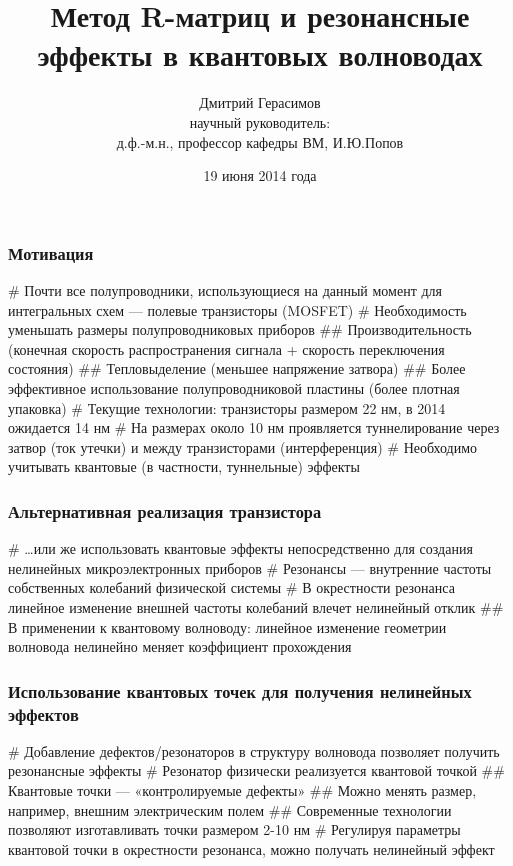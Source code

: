 \documentclass{beamer}
\title[]{Метод R-матриц и резонансные эффекты в квантовых волноводах}
\author[Дмитрий Герасимов]{Дмитрий Герасимов\\{\small научный руководитель: \\ д.ф.-м.н., профессор кафедры ВМ, И.Ю.Попов}}
\institute[ИТМО]{Университет ИТМО}
\date{19 июня 2014 года}
\begin{document}
\maketitle

\begin{frame}[fragile]
\frametitle{Мотивация}
\begin{easylist}[itemize]
# Почти все полупроводники, использующиеся на данный момент для интегральных схем — полевые транзисторы (MOSFET)
# Необходимость уменьшать размеры полупроводниковых приборов
## Производительность (конечная скорость распространения сигнала + скорость переключения состояния)
## Тепловыделение (меньшее напряжение затвора)
## Более эффективное использование полупроводниковой пластины (более плотная упаковка)
# Текущие технологии: транзисторы размером 22 нм, в 2014 ожидается 14 нм
# На размерах около 10 нм проявляется туннелирование через затвор (ток утечки) и между транзисторами (интерференция)
# Необходимо учитывать квантовые (в частности, туннельные) эффекты
\end{easylist}
\end{frame}

\begin{frame}[fragile]
\frametitle{Альтернативная реализация транзистора}
\begin{easylist}[itemize]
# \dots или же использовать квантовые эффекты непосредственно для создания нелинейных микроэлектронных приборов
# Резонансы — внутренние частоты собственных колебаний физической системы
# В окрестности резонанса линейное изменение внешней частоты колебаний влечет нелинейный отклик
## В применении к квантовому волноводу: линейное изменение геометрии волновода нелинейно меняет коэффициент прохождения
\end{easylist}
\end{frame}

\begin{frame}[fragile]
\frametitle{Использование квантовых точек для получения нелинейных эффектов}
\begin{easylist}[itemize]
# Добавление дефектов/резонаторов в структуру волновода позволяет получить резонансные эффекты
# Резонатор физически реализуется квантовой точкой
## Квантовые точки — «контролируемые дефекты»
## Можно менять размер, например, внешним электрическим полем
## Современные технологии позволяют изготавливать точки размером 2-10 нм
# Регулируя параметры квантовой точки в окрестности резонанса, можно получать нелинейный эффект
\end{easylist}
\end{frame}
\end{document}
